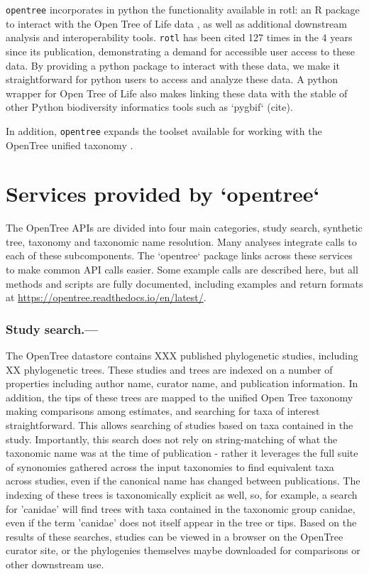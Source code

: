\documentclass[oupdraft]{sysbio_sse}
\begin{document}
\texttt{opentree} incorporates in python the functionality available in rotl: an {R} package to interact with the Open Tree of Life data \citep{michonneau_rotl:_2016}, as well as additional downstream analysis and interoperability tools.
\texttt{rotl}  has been cited 127 times in the 4 years since its publication, demonstrating a demand for accessible user access to these data.
By providing a python package to interact with these data, we make it straightforward for python users to access and analyze these data.
A python wrapper for Open Tree of Life also makes linking these data with the stable of other Python biodiversity informatics tools such as  `pygbif` (cite).

In addition, \texttt{opentree} expands the toolset available for working with the OpenTree unified taxonomy \citep{rees_automated_2017}.


\bigskip
\section{Services provided by `opentree`}
\label{sec3}


The OpenTree APIs are divided into four main categories, study search, synthetic tree, taxonomy and taxonomic name resolution.
Many analyses integrate calls to each of these subcomponents. 
The `opentree` package links across these services to make common API calls easier.
Some example calls are described here, but all methods and scripts are fully documented, including examples and return formats at \url{https://opentree.readthedocs.io/en/latest/}.

\subsubsection{Study search.---} The OpenTree datastore contains XXX published phylogenetic studies, including XX phylogenetic trees.
These studies and trees are indexed on a number of properties including author name, curator name, and publication information. 
In addition, the tips of these trees are mapped to the unified Open Tree taxonomy making comparisons among estimates, and searching for taxa of interest straightforward.
This allows searching of studies based on taxa contained in the study.
Importantly, this search does not rely on string-matching of what the taxonomic name was at the time of publication - rather it leverages the full suite of synonomies gathered across the input taxonomies to find equivalent taxa across studies, even if the canonical name has changed between publications.
The indexing of these trees is taxonomically explicit as well, so, for example, a search for 'canidae' will find trees with taxa contained in the taxonomic group canidae, even if the term 'canidae' does not itself appear in the tree or tips.
Based on the results of these searches, studies can be viewed in a browser on the OpenTree curator site, or the phylogenies themselves maybe downloaded for comparisons or other downstream use.
\end{document}
